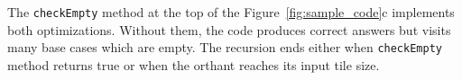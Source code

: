 
The \texttt{checkEmpty} method at the top of the
Figure~\ref{fig:sample_code}c implements both optimizations.  Without them,
the code produces correct answers but visits many base cases which are empty.
The recursion ends either when \texttt{checkEmpty} method returns true or when
the orthant reaches its input tile size.

%

